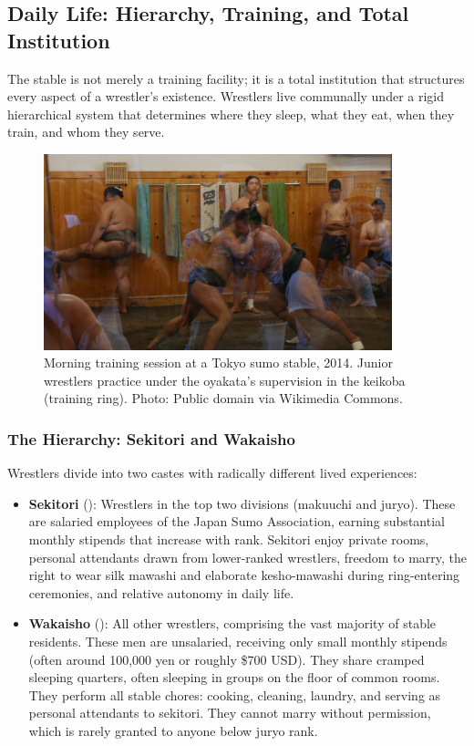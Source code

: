 \subsection{Daily Life: Hierarchy, Training, and Total Institution}

The stable is not merely a training facility; it is a total institution that structures every aspect of a wrestler's existence. Wrestlers live communally under a rigid hierarchical system that determines where they sleep, what they eat, when they train, and whom they serve.

\begin{figure}[h]
\centering
\includegraphics[width=0.9\textwidth]{images/ch01_history/sumo_training.jpg}
\caption{Morning training session at a Tokyo sumo stable, 2014. Junior wrestlers practice under the oyakata's supervision in the keikoba (training ring). Photo: Public domain via Wikimedia Commons.}
\label{fig:sumo_training}
\end{figure}

\subsubsection{The Hierarchy: Sekitori and Wakaisho}

Wrestlers divide into two castes with radically different lived experiences:

\begin{itemize}
\item \textbf{Sekitori} (): Wrestlers in the top two divisions (makuuchi and juryo). These are salaried employees of the Japan Sumo Association, earning substantial monthly stipends that increase with rank. Sekitori enjoy private rooms, personal attendants drawn from lower-ranked wrestlers, freedom to marry, the right to wear silk mawashi and elaborate kesho-mawashi during ring-entering ceremonies, and relative autonomy in daily life.
\item \textbf{Wakaisho} (): All other wrestlers, comprising the vast majority of stable residents. These men are unsalaried, receiving only small monthly stipends (often around 100,000 yen or roughly \$700 USD). They share cramped sleeping quarters, often sleeping in groups on the floor of common rooms. They perform all stable chores: cooking, cleaning, laundry, and serving as personal attendants to sekitori. They cannot marry without permission, which is rarely granted to anyone below juryo rank.
\end{itemize}

